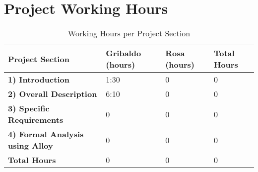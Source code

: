 \section*{Project Working Hours}

\begin{table}[ht!]
\centering
\begin{tabular}{|p{6cm}|p{2.5cm}|p{2.5cm}|p{2.5cm}|}
\hline
\textbf{Project Section} & \textbf{Gribaldo (hours)} & \textbf{Rosa (hours)} & \textbf{Total Hours} \\
\hline
\textbf{ 1) Introduction}                   & 1:30   & 0   & 0   \\
\textbf{ 2) Overall Description}            & 6:10    & 0  & 0   \\
\textbf{ 3) Specific Requirements}          & 0     & 0   & 0   \\
\textbf{ 4) Formal Analysis using Alloy}    & 0     & 0      & 0   \\
\hline
\textbf{Total Hours}                        & 0     & 0     & 0   \\
\hline
\end{tabular}
\caption{Working Hours per Project Section}
\label{tab:working_hours}
\end{table}

\vspace*{\fill}

